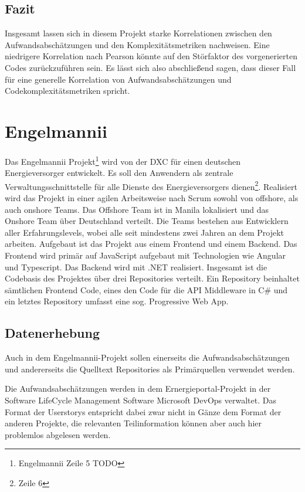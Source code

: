 \subsection{Fazit}\label{lm-fazit}

Insgesamt lassen sich in diesem Projekt starke Korrelationen zwischen
den Aufwandsabschätzungen und den Komplexitätsmetriken nachweisen. Eine
niedrigere Korrelation nach Pearson könnte auf den Störfaktor des
vorgenerierten Codes zurückzuführen sein. Es lässt sich also
abschlie\ss end sagen, dass dieser Fall für eine generelle Korrelation von
Aufwandsabschätzungen und Codekomplexitätsmetriken spricht.

\section{Engelmannii}\label{engelmannii}

Das Engelmannii Projekt\footnote{Engelmannii Zeile 5 TODO} wird von der
DXC für einen deutschen Energieversorger entwickelt. Es soll den
Anwendern als zentrale Verwaltungsschnittstelle für alle Dienste des
Energieversorgers dienen\footnote{Zeile 6}. Realisiert wird das Projekt
in einer agilen Arbeitsweise nach Scrum sowohl von offshore, als auch
onshore Teams. Das Offshore Team ist in Manila lokalisiert und das
Onshore Team über Deutschland verteilt. Die Teams bestehen aus
Entwicklern aller Erfahrungslevels, wobei alle seit mindestens zwei
Jahren an dem Projekt arbeiten. Aufgebaut ist das Projekt aus einem
Frontend und einem Backend. Das Frontend wird primär auf JavaScript
aufgebaut mit Technologien wie Angular und Typescript. Das Backend wird
mit .NET realisiert. Insgesamt ist die Codebasis des Projektes über drei
Repositories verteilt. Ein Repository beinhaltet sämtlichen Frontend
Code, eines den Code für die \ac{API} Middleware in C\# und ein letztes
Repository umfasst eine sog. Progressive Web App.

\subsection{Datenerhebung}\label{engelmannii-Datenerhebung}

Auch in dem Engelmannii-Projekt sollen einerseits die
Aufwandsabschätzungen und andererseits die Quelltext Repositories als
Primärquellen verwendet werden.

Die Aufwandsabschätzungen werden in dem Ernergieportal-Projekt in der
Software LifeCycle Management Software Microsoft DevOps verwaltet. Das
Format der Userstorys entspricht dabei zwar nicht in Gänze dem Format
der anderen Projekte, die relevanten Teilinformation können aber auch
hier problemlos abgelesen werden.

